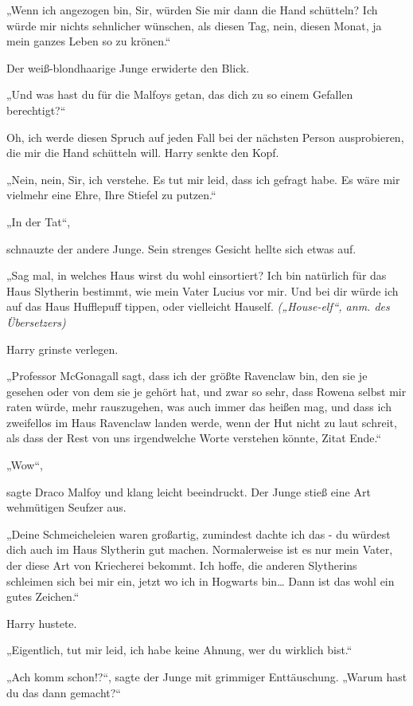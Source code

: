 {„Wenn ich angezogen bin, Sir, würden Sie mir dann die Hand schütteln? Ich würde mir nichts sehnlicher wünschen, als diesen Tag, nein, diesen Monat, ja mein ganzes Leben so zu krönen.“

Der weiß-blondhaarige Junge erwiderte den Blick.

„Und was hast du für die Malfoys getan, das dich zu so einem Gefallen berechtigt?“

Oh, ich werde diesen Spruch auf jeden Fall bei der nächsten Person ausprobieren, die mir die Hand schütteln will. Harry senkte den Kopf.

„Nein, nein, Sir, ich verstehe. Es tut mir leid, dass ich gefragt habe. Es wäre mir vielmehr eine Ehre, Ihre Stiefel zu putzen.“

„In der Tat“,

schnauzte der andere Junge. Sein strenges Gesicht hellte sich etwas auf.

„Sag mal, in welches Haus wirst du wohl einsortiert? Ich bin natürlich für das Haus Slytherin bestimmt, wie mein Vater Lucius vor mir. Und bei dir würde ich auf das Haus Hufflepuff tippen, oder vielleicht Hauself. \emph{(„House-elf“, anm. des Übersetzers)}

Harry grinste verlegen.

„Professor McGonagall sagt, dass ich der größte Ravenclaw bin, den sie je gesehen oder von dem sie je gehört hat, und zwar so sehr, dass Rowena selbst mir raten würde, mehr rauszugehen, was auch immer das heißen mag, und dass ich zweifellos im Haus Ravenclaw landen werde, wenn der Hut nicht zu laut schreit, als dass der Rest von uns irgendwelche Worte verstehen könnte, Zitat Ende.“

„Wow“,

sagte Draco Malfoy und klang leicht beeindruckt. Der Junge stieß eine Art wehmütigen Seufzer aus.

„Deine Schmeicheleien waren großartig, zumindest dachte ich das - du würdest dich auch im Haus Slytherin gut machen. Normalerweise ist es nur mein Vater, der diese Art von Kriecherei bekommt. Ich hoffe, die anderen Slytherins schleimen sich bei mir ein, jetzt wo ich in Hogwarts bin… Dann ist das wohl ein gutes Zeichen.“

Harry hustete.

„Eigentlich, tut mir leid, ich habe keine Ahnung, wer du wirklich bist.“

„Ach komm schon!?“, sagte der Junge mit grimmiger Enttäuschung. „Warum hast du das dann gemacht?“

}
